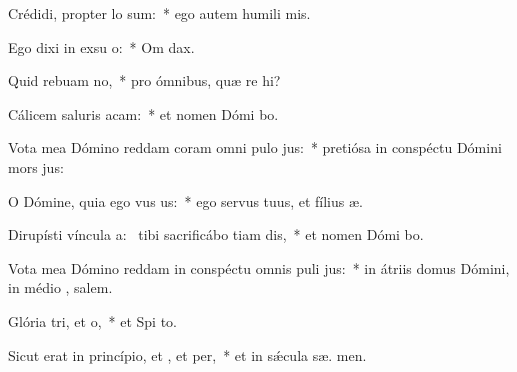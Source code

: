 \item Crédidi, propter  lo sum:~* ego autem humili  mis.
\item Ego dixi in exsu o:~* Om  dax.
\item Quid rebuam no,~* pro ómnibus, quæ re hi?
\item Cálicem saluris acam:~* et nomen Dómi bo.
\item Vota mea Dómino reddam coram omni pulo jus:~* pretiósa in conspéctu Dómini mors  jus:
\item O Dómine, quia ego vus us:~* ego servus tuus, et fílius  æ.
\item Dirupísti víncula a:~\pscross{} tibi sacrificábo tiam dis,~* et nomen Dómi bo.
\item Vota mea Dómino reddam in conspéctu omnis puli jus:~* in átriis domus Dómini, in médio , salem.
\item Glória tri, et o,~* et Spi to.
\item Sicut erat in princípio, et , et per,~* et in sǽcula sæ. men.
